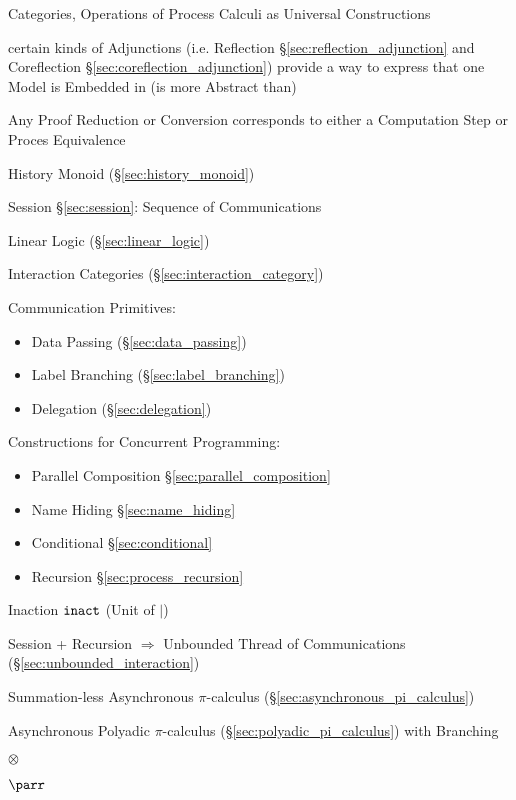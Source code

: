 Categories, Operations of Process Calculi as Universal Constructions

certain kinds of Adjunctions (i.e. Reflection
\S\ref{sec:reflection_adjunction} and Coreflection
\S\ref{sec:coreflection_adjunction}) provide a way to express that one
Model is Embedded in (is more Abstract than)


\asterism


Any Proof Reduction or Conversion corresponds to either a Computation
Step or Proces Equivalence \cite{caires-pfenning10}

History Monoid (\S\ref{sec:history_monoid})

Session \S\ref{sec:session}: Sequence of Communications

Linear Logic (\S\ref{sec:linear_logic})

Interaction Categories (\S\ref{sec:interaction_category})


Communication Primitives:
\begin{itemize}
  \item Data Passing (\S\ref{sec:data_passing})
  \item Label Branching (\S\ref{sec:label_branching})
  \item Delegation (\S\ref{sec:delegation})
\end{itemize}


Constructions for Concurrent Programming:
\cite{honda-vasconcelos-kubo98}
\begin{itemize}
  \item Parallel Composition \S\ref{sec:parallel_composition}
  \item Name Hiding \S\ref{sec:name_hiding}
  \item Conditional \S\ref{sec:conditional}
  \item Recursion \S\ref{sec:process_recursion}
\end{itemize}

Inaction $\mathtt{inact}$ (Unit of $|$)


Session + Recursion $\Rightarrow$ Unbounded Thread of Communications
(\S\ref{sec:unbounded_interaction}) \cite{honda-vasconcelos-kubo98}

Summation-less Asynchronous $\pi$-calculus
(\S\ref{sec:asynchronous_pi_calculus}) \cite{honda-vasconcelos-kubo98}

Asynchronous Polyadic $\pi$-calculus
(\S\ref{sec:polyadic_pi_calculus}) with Branching
\cite{honda-vasconcelos-kubo98}


$\otimes$

$\parr$



